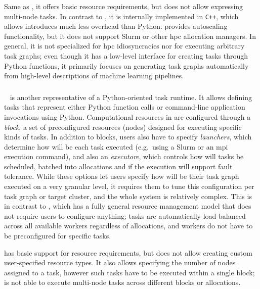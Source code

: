 Same as \dask{}, it offers basic resource requirements, but does not allow
expressing multi-node tasks. In contrast to \dask{}, it is internally implemented
in \texttt{C++}, which allows introduces much less overhead than Python.
\ray{} provides autoscaling functionality, but it does not support Slurm or other
\gls{hpc} allocation managers. In general, it is not specialized for
\gls{hpc} idiosyncracies nor for executing arbitrary task graphs; even though it has
a low-level interface for creating tasks through Python functions, it primarily focuses on
generating task graphs automatically from high-level descriptions of machine learning pipelines.

\subsubsection*{\parsl}
\parsl~\cite{parsl} is another representative of a Python-oriented task runtime. It
allows
defining tasks that represent either Python function calls or command-line application
invocations using Python. Computational resources in \parsl are configured through a
\emph{block}, a set of preconfigured resources (nodes) designed for executing specific
kinds of tasks. In addition to blocks, users also have to specify \emph{launchers}, which
determine how will be each task executed (e.g.\ using a Slurm or an \gls{mpi}
execution command), and also an \emph{executore}, which controls how will tasks be
scheduled, batched into allocations and if the execution will support fault tolerance. While these
options let users specify how will be their task graph executed on a very granular level, it
requires them to tune this configuration per task graph or target cluster, and the whole system is
relatively complex. This is in contrast to \hyperqueue, which has a fully general resource
management model that does not require users to configure anything; tasks are automatically
load-balanced across all available workers regardless of allocations, and workers do not have to be
preconfigured for specific tasks.

\parsl has basic support for resource requirements, but does not allow
creating custom user-specified resource types. It also allows specifying the number of nodes
assigned to a task, however such tasks have to be executed within a single block; \parsl
is not able to execute multi-node tasks across different blocks or allocations.

